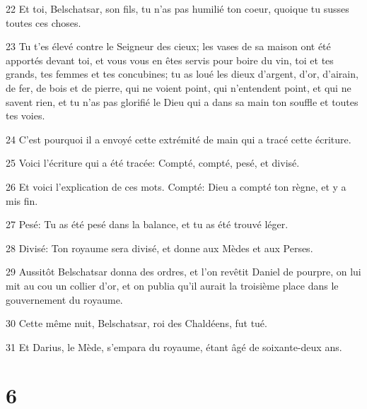 \par 22 Et toi, Belschatsar, son fils, tu n'as pas humilié ton coeur, quoique tu susses toutes ces choses.
\par 23 Tu t'es élevé contre le Seigneur des cieux; les vases de sa maison ont été apportés devant toi, et vous vous en êtes servis pour boire du vin, toi et tes grands, tes femmes et tes concubines; tu as loué les dieux d'argent, d'or, d'airain, de fer, de bois et de pierre, qui ne voient point, qui n'entendent point, et qui ne savent rien, et tu n'as pas glorifié le Dieu qui a dans sa main ton souffle et toutes tes voies.
\par 24 C'est pourquoi il a envoyé cette extrémité de main qui a tracé cette écriture.
\par 25 Voici l'écriture qui a été tracée: Compté, compté, pesé, et divisé.
\par 26 Et voici l'explication de ces mots. Compté: Dieu a compté ton règne, et y a mis fin.
\par 27 Pesé: Tu as été pesé dans la balance, et tu as été trouvé léger.
\par 28 Divisé: Ton royaume sera divisé, et donne aux Mèdes et aux Perses.
\par 29 Aussitôt Belschatsar donna des ordres, et l'on revêtit Daniel de pourpre, on lui mit au cou un collier d'or, et on publia qu'il aurait la troisième place dans le gouvernement du royaume.
\par 30 Cette même nuit, Belschatsar, roi des Chaldéens, fut tué.
\par 31 Et Darius, le Mède, s'empara du royaume, étant âgé de soixante-deux ans.

\chapter{6}

